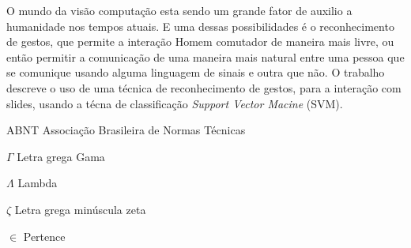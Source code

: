 \documentclass[12pt,oneside,a4paper,chapter=TITLE,section=TITLE,sumario=tradicional]{abntex2}
\begin{document}

\imprimircapa
\imprimirfolhaderosto

\begin{resumo}
   O mundo da visão computação esta sendo um grande fator de auxilio a humanidade nos tempos atuais. E uma dessas possibilidades é o reconhecimento de gestos, que permite a interação Homem comutador de maneira mais livre, ou então permitir a comunicação de uma maneira mais natural entre uma pessoa que se comunique usando alguma linguagem de sinais e outra que não.
O trabalho descreve o uso de uma técnica de reconhecimento de gestos, para a interação com slides, usando a técna de classificação {\itshape Support Vector Macine} (SVM).
    
\end{resumo}

\listadefiguras
\listadegraficos
\listadetabelas
\listadequadros
\listadecodigos
\listadealgoritmos

\begin{siglas}
  \item[ABNT] Associação Brasileira de Normas Técnicas
\end{siglas}

\begin{simbolos}
  \item[$ \Gamma $] Letra grega Gama
  \item[$ \Lambda $] Lambda
  \item[$ \zeta $] Letra grega minúscula zeta
  \item[$ \in $] Pertence
\end{simbolos}

\sumario

\textual
\end{document}
